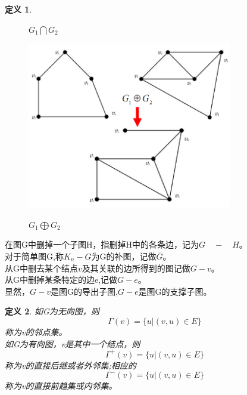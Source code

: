 \documentclass[11pt,a4paper,openany]{book}
\newcommand{\song}{\CJKfamily{song}}
\newtheorem{defination}{\textbf{定义}}[section]
\begin{document}
\begin{defination}
\begin{figure}[H]
  \caption{$G_1\bigcap G_2$}
\end{figure}
\begin{figure}[H]
  \centering
  \includegraphics[width=0.8\textwidth]{1.6.3.png}\\
  \caption{$G_1\bigoplus G_2$}\label{fig:163}
\end{figure}
\end{defination}
\song
{
在图G中删掉一个子图H，指删掉H中的各条边，记为\textcolor[rgb]{1.00,0.00,0.00}{$G\quad -\quad H$}。\\
对于简单图G,称$K_n - G$为G的\textcolor[rgb]{1.00,0.00,0.00}{补图}，记做\textcolor[rgb]{1.00,0.00,0.00}{$\bar{G}$}。\\
从G中删去某个结点$v$及其关联的边所得到的图记做\textcolor[rgb]{1.00,0.00,0.00}{$G-v$}。\\
从G中删掉某条特定的边e,记做\textcolor[rgb]{1.00,0.00,0.00}{$G-e$}。\\
显然，$G-v$是图G的导出子图,$G-e$是图G的支撑子图。\\
}
\begin{defination}
如G为无向图，则$$\Gamma(v)=\{u|(v,u)\in E\}$$称为v的\textcolor[rgb]{1.00,0.00,0.00}{邻点集}。\\
如G为有向图，v是其中一个结点，则$$\Gamma^{+}(v)=\{u|(v,u)\in E\}$$称为v的直接后继或者\textcolor[rgb]{1.00,0.00,0.00}{外邻集};相应的
$$\Gamma^{-}(v)=\{u|(v,u)\in E\}$$称为v的直接前趋集或内邻集。\\
\end{defination}
\end{document}
